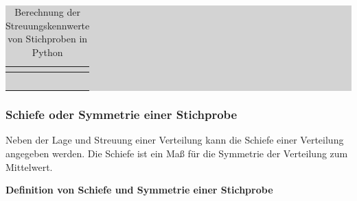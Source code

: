 \begin{table}[H]
\setlength{\arrayrulewidth}{.1em}
\caption{Berechnung der Streuungskennwerte von Stichproben in Python}
\setlength{\fboxsep}{0pt}%
\colorbox{lightgray}{%
%
\begin{tabular}{| c | c |}
\hline
\parbox[c][0.3in][c]{3.3in}{\smallskip\centering\textbf{\selectfont{Streuungskennwert}}} & 
\parbox[c][0.3in][c]{3.3in}{\smallskip\centering\textbf{\selectfont{Python-Befehl}}}\\ \hline

\parbox[c][0.3in][c]{3.3in}{\centering{}\selectfont{Spannweite}} & 
\parbox[c][0.3in][c]{3.3in}{\centering{}\selectfont{max - min}}\\ \hline

\parbox[c][0.3in][c]{3.3in}{\centering{}\selectfont{Varianz}} & 
\parbox[c][0.3in][c]{3.3in}{\centering{}\selectfont{numpy.var}}\\ \hline

\parbox[c][0.3in][c]{3.3in}{\centering{}\selectfont{Standardabweichung}} & 
\parbox[c][0.3in][c]{3.3in}{\centering{}\selectfont{numpy.std}}\\ \hline

\parbox[c][0.3in][c]{3.3in}{\centering{}\selectfont{p-Quantil}} & 
\parbox[c][0.3in][c]{3.3in}{\centering{}\selectfont{numpy.quantile}}\\ \hline

\parbox[c][0.3in][c]{3.3in}{\centering{}\selectfont{Interquartilabstand}} & 
\parbox[c][0.3in][c]{3.3in}{\centering{}\selectfont{numpy.quantile}}\\ \hline

\end{tabular}%
}
\label{tab:threefourteen}
\end{table}


\subsubsection{Schiefe oder Symmetrie einer Stichprobe}

\noindent Neben der Lage und Streuung einer Verteilung kann die Schiefe einer Verteilung angegeben werden. Die Schiefe ist ein Ma{\ss} f\"{u}r die Symmetrie der Verteilung zum Mittelwert. 

{\selectfont
\noindent\textbf{Definition von Schiefe und Symmetrie einer Stichprobe}}

